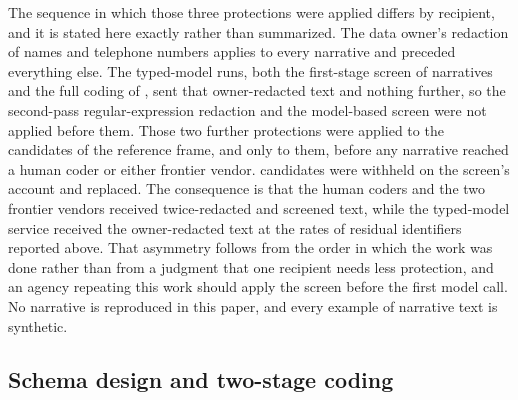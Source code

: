 The sequence in which those three protections were applied differs by recipient, and it is
stated here exactly rather than summarized. The data owner's redaction of names and telephone
numbers applies to every narrative and preceded everything else. The typed-model runs, both the
first-stage screen of \StageOneCoded{} narratives and the full coding of \NstageTwo{}, sent
that owner-redacted text and nothing further, so the second-pass regular-expression redaction
and the model-based screen were not applied before them. Those two further protections were
applied to the \DesignNCandidates{} candidates of the reference frame, and only to them, before
any narrative reached a human coder or either frontier vendor. \GoldPIIWithheld{} candidates
were withheld on the screen's account and replaced. The consequence is that the human coders
and the two frontier vendors received twice-redacted and screened text, while the typed-model
service received the owner-redacted text at the rates of residual identifiers reported above.
That asymmetry follows from the order in which the work was done rather than from a judgment
that one recipient needs less protection, and an agency repeating this work should apply the
screen before the first model call. No narrative is reproduced in this paper, and every example
of narrative text is synthetic.


\subsection{Schema design and two-stage coding}
\label{sec:schema}

